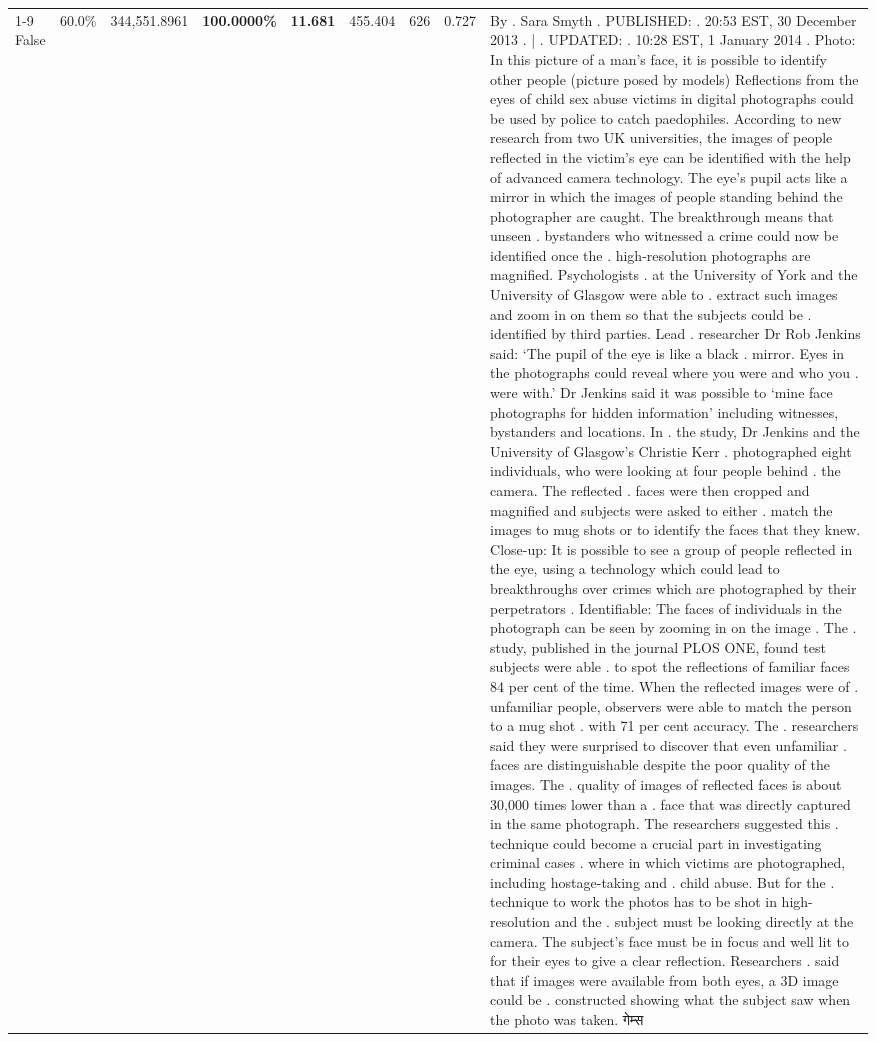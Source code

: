 \begin{table}[H]
\begin{tabular}{lllrlllll}
\cline{1-9}
False & 60.0\% & 344,551.8961 & \bfseries \color{red} 100.0000\% & \bfseries \color{red} 11.681 & 455.404 & 626 & 0.727 & By . Sara Smyth . PUBLISHED: . 20:53 EST, 30 December 2013 . | . UPDATED: . 10:28 EST, 1 January 2014 . Photo: In this picture of a man's face, it is possible to identify other people (picture posed by models) Reflections from the eyes of child sex abuse victims in digital photographs could be used by police to catch paedophiles. According to new research from two UK universities, the images of people reflected in the victim's eye can be identified with the help of advanced camera technology. The eye's pupil acts like a mirror in which the images of people standing behind the photographer are caught. The breakthrough means that unseen . bystanders who witnessed a crime could now be identified once the . high-resolution photographs are magnified. Psychologists . at the University of York and the University of Glasgow were able to . extract such images and zoom in on them so that the subjects could be . identified by third parties. Lead . researcher Dr Rob Jenkins said: ‘The pupil of the eye is like a black . mirror. Eyes in the photographs could reveal where you were and who you . were with.' Dr Jenkins said it was possible to ‘mine face photographs for hidden information' including witnesses, bystanders and locations. In . the study, Dr Jenkins and the University of Glasgow's Christie Kerr . photographed eight individuals, who were looking at four people behind . the camera. The reflected . faces were then cropped and magnified and subjects were asked to either . match the images to mug shots or to identify the faces that they knew. Close-up: It is possible to see a group of people reflected in the eye, using a technology which could lead to breakthroughs over crimes which are photographed by their perpetrators . Identifiable: The faces of individuals in the photograph can be seen by zooming in on the image . The . study, published in the journal PLOS ONE, found test subjects were able . to spot the reflections of familiar faces 84 per cent of the time. When the reflected images were of . unfamiliar people, observers were able to match the person to a mug shot . with 71 per cent accuracy. The . researchers said they were surprised to discover that even unfamiliar . faces are distinguishable despite the poor quality of the images. The . quality of images of reflected faces is about 30,000 times lower than a . face that was directly captured in the same photograph. The researchers suggested this . technique could become a crucial part in investigating criminal cases . where in which victims are photographed, including hostage-taking and . child abuse. But for the . technique to work the photos has to be shot in high-resolution and the . subject must be looking directly at the camera. The subject's face must be in focus and well lit to for their eyes to give a clear reflection. Researchers . said that if images were available from both eyes, a 3D image could be . constructed showing what the subject saw when the photo was taken. गेम्स \\

\end{tabular}
\end{table}
